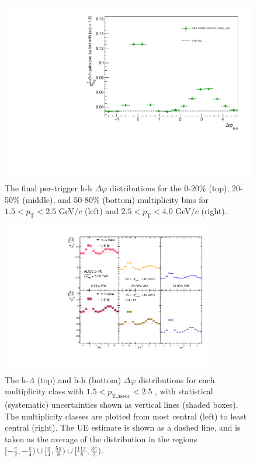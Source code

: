 \begin{figure}[ht]
\begin{minipage}{0.48\textwidth}
	\end{minipage}
	\begin{minipage}{0.48\textwidth}
		\includegraphics[width=\textwidth]{figures/analysis/h_h_dphi_avg6_50_80_highpt.pdf}
	\end{minipage}
	\caption{The final per-trigger h-h $\Delta\varphi$ distributions for the 0-20\% (top), 20-50\% (middle), and 50-80\% (bottom) multiplicity bins for $1.5 < p_{\text{T}} < 2.5$ GeV/$c$ (left) and $2.5 < p_{\text{T}} < 4.0$ GeV/$c$ (right).}
	\label{fig:h_h_1d_final}
\end{figure}

\begin{figure}[h!]
\centering
\includegraphics[width=0.83\textwidth]{figures/results/dphi_final_lowpt.pdf}
\caption{The h-$\Lambda$ (top) and h-h (bottom) $\Delta\varphi$ distributions for each multiplicity class with $1.5 < p_{\text{T,assoc}} < 2.5$ \GeVc, with statistical (systematic) uncertainties shown as vertical lines (shaded boxes). The multiplicity classes are plotted from most central (left) to least central (right). The UE estimate is shown as a dashed line, and is taken as the average of the distribution in the regions $[-\frac{\pi}{2}, -\frac{\pi}{4}) \cup [\frac{\pi}{4}, \frac{5\pi}{8}) \cup [\frac{11\pi}{8}, \frac{3\pi}{2})$.}
\label{fig:dphi_final_lowpt}
\end{figure}

